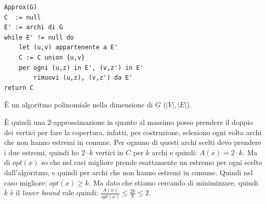 \begin{lstlisting}
Approx(G)
C  := null 
E' := archi di G
while E' != null do 
    let (u,v) appartenente a E'
    C := C union {u,v}
    per ogni (u,z) in E', (v,z') in E'
        rimuovi (u,z), (v,z') da E' 
return C
\end{lstlisting}

È un algoritmo polinomiale nella dimensione di $G$ ($|V|, |E|$).

È quindi una 2-approssimazione in quanto al massimo posso prendere il doppio dei vertici per fare la copertura, infatti, per costruzione, seleziono ogni volta archi che non hanno estremi in comune. Per ognuno di questi archi scelti devo prendere i due estremi, quindi ho $2\cdot k$ vertici in $C$ per $k$ archi e quindi: $A(x)=2\cdot k$.
Ma di $opt(x)$ so che nel casi migliore prende esattamente un estremo per ogni scelto dall'algoritmo, e quindi per archi che non hanno estremi in comune. Quindi nel caso migliore: $opt(x)\geq k$. Ma dato che stiamo cercando di minimizzare, quindi $k$ è il \textit{lower bound} vale quindi: $\displaystyle\frac{A(x)}{opt(x)}\leq\frac{2k}{k}\leq 2$.